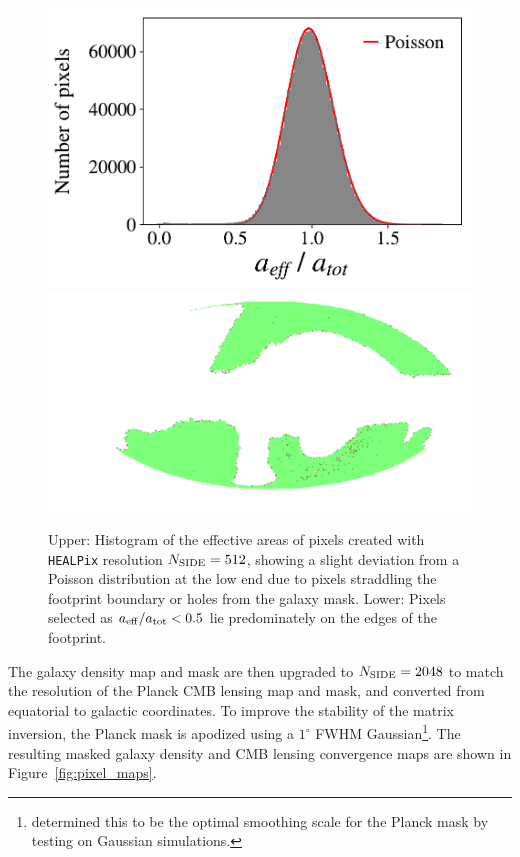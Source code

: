 \begin{figure}
    \centering
    \includegraphics[width=0.85\columnwidth, trim={0.1cm 0 0 0},clip]{figures/poisson.pdf}  
    \includegraphics[width=\columnwidth]{figures/boundary.pdf}
    \caption{Upper: Histogram of the effective areas of pixels created with \texttt{HEALPix} resolution $N_{\rm SIDE} = 512$, showing a slight deviation from a Poisson distribution at the low end due to pixels straddling the footprint boundary or holes from the galaxy mask. Lower: Pixels selected as $a_{\rm eff}/a_{\rm tot} < 0.5$ lie predominately on the edges of the footprint.}
    \label{fig:desi_mask}
\end{figure}

The galaxy density map and mask are then upgraded to $N_{\rm SIDE} = 2048$ to match the resolution of the Planck CMB lensing map and mask, and converted from equatorial to galactic coordinates. To improve the stability of the matrix inversion, the Planck mask is apodized using a $1^{\circ}$ FWHM Gaussian\footnote{\citealt{Krolewski19} determined this to be the optimal smoothing scale for the Planck mask by testing on Gaussian simulations.}. The resulting masked galaxy density and CMB lensing convergence maps are shown in Figure~\ref{fig:pixel_maps}.

